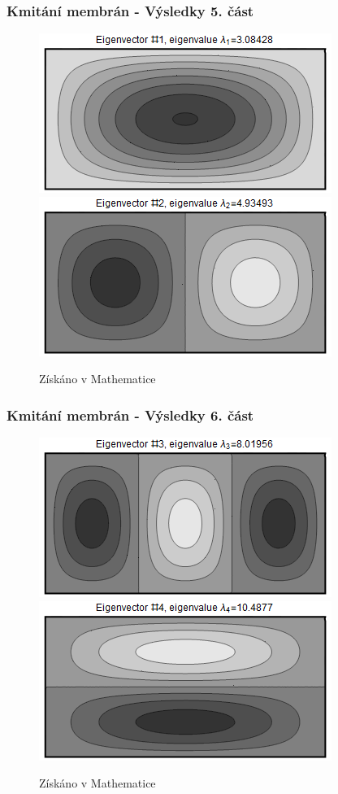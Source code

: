 \documentclass{beamer}
\begin{document}
\begin{frame}
\frametitle{Kmitání membrán - Výsledky 5. část}
\centering
\begin{figure}
\includegraphics[width=.6\linewidth]{rectangle-eigenvector-1.png}
\includegraphics[width=.6\linewidth]{rectangle-eigenvector-2.png}
\caption{Získáno v Mathematice}
\end{figure}
\end{frame}

\begin{frame}
\frametitle{Kmitání membrán - Výsledky 6. část}
\centering
\begin{figure}
\includegraphics[width=.6\linewidth]{rectangle-eigenvector-3.png}
\includegraphics[width=.6\linewidth]{rectangle-eigenvector-4.png}
\caption{Získáno v Mathematice}
\end{figure}
\end{frame}
\end{document}
